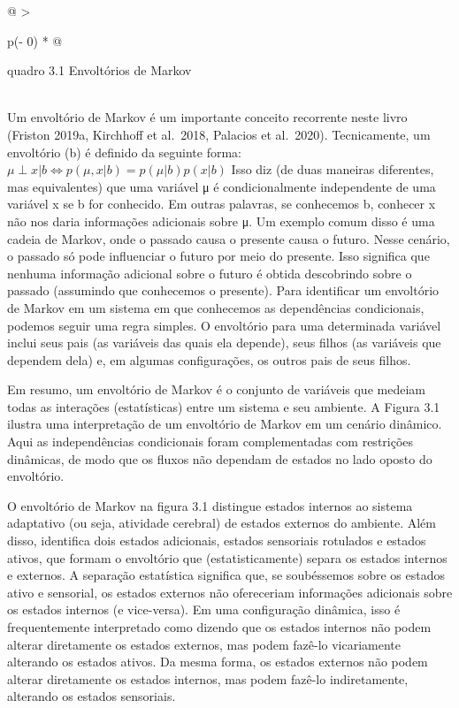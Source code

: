 \documentclass[
  12pt,
]{book}
\begin{document}
\begin{longtable}[]{@{}
  >{\raggedright\arraybackslash}p{(\columnwidth - 0\tabcolsep) * }@{}}
\toprule
\begin{minipage}[b]{\linewidth}\raggedright
quadro 3.1 Envoltórios de Markov
\end{minipage} \\
\midrule
\endhead
Um envoltório de Markov é um importante conceito recorrente neste livro (Friston 2019a, Kirchhoff et al.~2018, Palacios et al.~2020). Tecnicamente, um envoltório (b) é definido da seguinte forma: \( \mu \perp x|b \Longleftrightarrow p(\mu, x|b) = p(\mu|b)p(x|b)\) Isso diz (de duas maneiras diferentes, mas equivalentes) que uma variável μ é condicionalmente independente de uma variável x se b for conhecido. Em outras palavras, se conhecemos b, conhecer x não nos daria informações adicionais sobre μ. Um exemplo comum disso é uma cadeia de Markov, onde o passado causa o presente causa o futuro. Nesse cenário, o passado só pode influenciar o futuro por meio do presente. Isso significa que nenhuma informação adicional sobre o futuro é obtida descobrindo sobre o passado (assumindo que conhecemos o presente). Para identificar um envoltório de Markov em um sistema em que conhecemos as dependências condicionais, podemos seguir uma regra simples. O envoltório para uma determinada variável inclui seus pais (as variáveis das quais ela depende), seus filhos (as variáveis que dependem dela) e, em algumas configurações, os outros pais de seus filhos. \\
\bottomrule
\end{longtable}

Em resumo, um envoltório de Markov é o conjunto de variáveis que medeiam todas as interações (estatísticas) entre um sistema e seu ambiente. A Figura 3.1 ilustra uma interpretação de um envoltório de Markov em um cenário dinâmico. Aqui as independências condicionais foram complementadas com restrições dinâmicas, de modo que os fluxos não dependam de estados no lado oposto do envoltório.

O envoltório de Markov na figura 3.1 distingue estados internos ao sistema adaptativo (ou seja, atividade cerebral) de estados externos do ambiente. Além disso, identifica dois estados adicionais, estados sensoriais rotulados e estados ativos, que formam o envoltório que (estatisticamente) separa os estados internos e externos. A separação estatística significa que, se soubéssemos sobre os estados ativo e sensorial, os estados externos não ofereceriam informações adicionais sobre os estados internos (e vice-versa). Em uma configuração dinâmica, isso é frequentemente interpretado como dizendo que os estados internos não podem alterar diretamente os estados externos, mas podem fazê-lo vicariamente alterando os estados ativos. Da mesma forma, os estados externos não podem alterar diretamente os estados internos, mas podem fazê-lo indiretamente, alterando os estados sensoriais.
\end{document}
